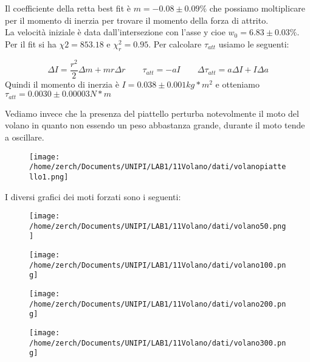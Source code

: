 \documentclass[a4paper,10pt]{article}
\begin{document}
Il coefficiente della retta best fit è $m=-0.08\pm0.09 \% $ che possiamo moltiplicare per il momento di inerzia per trovare il momento della forza di attrito.
\begin{equation}
\end{equation}
La velocità iniziale è data dall'intersezione con l'asse y cioe $w_0=6.83\pm0.03 \% $. Per il fit si ha $\chi2 =853.18$ e $\chi^2_r=0.95$. Per calcolare $\tau_{att}$ usiamo le seguenti:

\begin{equation}
 \Delta I=\frac{r^2}{2}\Delta m+mr \Delta r \qquad \tau_{att}=-aI \qquad \Delta \tau_{att}=a\Delta I+I\Delta a
\end{equation}
Quindi il momento di inerzia è $I=0.038 \pm0.001kg*m^2$ e otteniamo $\tau_{att}=  0.0030\pm 0.00003 N*m$


Vediamo invece che la presenza del piattello perturba notevolmente il moto del volano in quanto non essendo un peso abbastanza grande, durante il moto tende a oscillare.

 \begin {figure}[!htb]
\begin{center}
\texttt{[image: /home/zerch/Documents/UNIPI/LAB1/11Volano/dati/volanopiattello1.png]}
\end{center}
\end{figure}

I diversi grafici dei moti forzati sono i seguenti:

 \begin {figure}[!htb]
\begin{center}
\texttt{[image: /home/zerch/Documents/UNIPI/LAB1/11Volano/dati/volano50.png]}
\end{center}
\end{figure}

\begin {figure}[!htb]
\begin{center}
\texttt{[image: /home/zerch/Documents/UNIPI/LAB1/11Volano/dati/volano100.png]}
\end{center}
\end{figure}

\begin {figure}[!htb]
\begin{center}
\texttt{[image: /home/zerch/Documents/UNIPI/LAB1/11Volano/dati/volano200.png]}
\end{center}
\end{figure} 

\begin {figure}[!htb]
\begin{center}
\texttt{[image: /home/zerch/Documents/UNIPI/LAB1/11Volano/dati/volano300.png]}
\end{center}
\end{figure}
\end{document}
